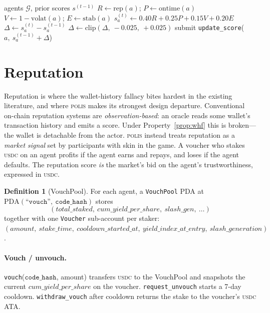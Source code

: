 \documentclass[10pt,conference,letterpaper]{IEEEtran}
\theoremstyle{definition}
\newtheorem{definition}[theorem]{Definition}
\newcommand{\polis}{\textsc{polis}\xspace}
\newcommand{\codehash}{\texttt{code\_hash}}
\newcommand{\PDA}[1]{\ensuremath{\mathrm{PDA}(#1)}}
\newcommand{\USDC}{\textsc{usdc}}
\begin{document}
\begin{algorithm}[t]
\caption{Daily BCS update (oracle $\mathcal{O}$).}
\label{alg:bcs}
\begin{algorithmic}[1]
\Require agents $\mathcal{G}$, prior scores $s^{(t-1)}$
  \State $R \gets \mathrm{rep}(a)$;
    $P \gets \mathrm{ontime}(a)$
  \State $V \gets 1 - \mathrm{volat}(a)$;
    $E \gets \mathrm{stab}(a)$
  \State $s^{(t)}_a \gets 0.40R + 0.25P + 0.15V + 0.20E$
  \State $\Delta \gets s^{(t)}_a - s^{(t-1)}_a$
  \State $\Delta \gets \mathrm{clip}(\Delta,\ -0.025,\ +0.025)$
  \State submit \texttt{update\_score}($a,\ s^{(t-1)}_a + \Delta$)
\EndFor
\end{algorithmic}
\end{algorithm}

\section{Reputation}\label{sec:reputation}

Reputation is where the wallet-history fallacy bites hardest in the
existing literature, and where \polis makes its strongest design
departure. Conventional on-chain reputation systems
\cite{arcx2022,credprotocol2023} are \emph{observation-based}: an
oracle reads some wallet's transaction history and emits a score.
Under Property~\ref{prop:whf} this is broken---the wallet is
detachable from the actor. \polis instead treats reputation as a
\emph{market signal} set by participants with skin in the game. A
voucher who stakes \USDC{} on an agent profits if the agent earns and
repays, and loses if the agent defaults. The reputation score
\emph{is} the market's bid on the agent's trustworthiness, expressed
in \USDC.

\begin{definition}[VouchPool]\label{def:vouchpool}
For each agent, a \texttt{VouchPool} PDA at
$\PDA{\texttt{``vouch''},\ \codehash}$ stores
\[
(\mathit{total\_staked},\ \mathit{cum\_yield\_per\_share},\ \mathit{slash\_gen},\ \ldots)
\]
together with one \texttt{Voucher} sub-account per staker:
$(\mathit{amount},\ \mathit{stake\_time},\ \mathit{cooldown\_started\_at},\ \mathit{yield\_index\_at\_entry},\ \mathit{slash\_generation})$.
\end{definition}

\paragraph{Vouch / unvouch.}
\texttt{vouch}($\codehash$, amount) transfers \USDC{} to the VouchPool
and snapshots the current $\mathit{cum\_yield\_per\_share}$ on the
voucher.
\texttt{request\_unvouch} starts a 7-day cooldown.
\texttt{withdraw\_vouch} after cooldown returns the stake to the
voucher's \USDC{} ATA.
\end{document}
